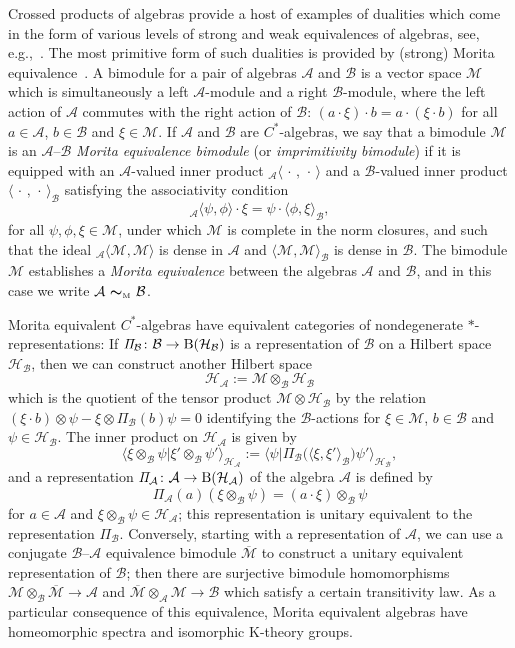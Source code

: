 \documentclass[pdftex]{sigma}
\numberwithin{equation}{section}
\newcommand{\mbf}[1]{{\boldsymbol {#1} }}
\newcommand{\Pim}{{\mathit\Pi}}
\newcommand{\rmB}{{\rm B}}
\def\alg{{\mathcal A}}
\def\balg{{\mathcal B}}
\def\hil{{\mathcal H}}
\def\Mcal{{\mathcal M}}
\begin{document}
Crossed products of algebras provide a host of examples of dualities
which come in the form of various levels of strong and weak
equivalences of algebras, see, e.g.,~\cite{Brodzki2006}. The most
primitive form of such dualities is provided by (strong) Morita
equivalence~\cite{Rieffel1974}. A bimodule for a pair of algebras $\alg$ and $\balg$ is a
vector space $\Mcal$ which is simultaneously
 a left $\alg$-module and a right $\balg$-module, where the left action
 of $\alg$ commutes with the right action of $\balg$: $(a\cdot\xi)\cdot
 b=a\cdot (\xi\cdot b)$ for all $a\in \alg$, $b\in
 \balg$ and $\xi\in \Mcal$. If $\alg$ and $\balg$ are $C^*$-algebras,
 we say that a bimodule $\Mcal$ is an $\alg$--$\balg$ \emph{Morita
 equivalence bimodule} (or \emph{imprimitivity bimodule}) if it
is equipped with an $\alg$-valued inner product
${}_\alg\langle\,\cdot\,,\,\cdot\,\rangle$ and a $\balg$-valued inner
product $\langle\,\cdot\,,\,\cdot\,\rangle_\balg$ satisfying the
associativity condition
\[
{}_\alg\langle \psi,\phi\rangle \cdot \xi =
\psi\cdot\langle\phi,\xi\rangle_\balg ,
\]
for all $\psi,\phi,\xi\in\Mcal$, under which $\Mcal$ is complete in
the norm closures, and such that the ideal ${}_\alg\langle
\Mcal,\Mcal\rangle$ is dense in $\alg$ and $\langle
\Mcal,\Mcal\rangle_\balg$ is dense in $\balg$. The bimodule $\Mcal$ establishes a
\emph{Morita equivalence} between the algebras $\alg$ and $\balg$, and
in this case we write $\alg\ \mbf\sim_{\text{\tiny M}}\ \balg$.

Morita equivalent $C^*$-algebras have equivalent categories of
nondegenerate $*$-representations: If $\Pim_\balg\colon \balg\to{\rm B}(\hil_\balg)$ is a
representation of $\balg$ on a Hilbert space $\hil_\balg$, then we can
construct another Hilbert space
\[
\hil_\alg:=\Mcal\otimes_\balg\hil_\balg
\]
which is the quotient of the tensor product $\Mcal\otimes\hil_\balg$ by the relation $(\xi\cdot
b)\otimes\psi-\xi\otimes\Pim_\balg(b)\psi=0$ identifying the
$\balg$-actions for
$\xi\in\Mcal$, $b\in\balg$ and $\psi\in\hil_\balg$. The inner product
on $\hil_\alg$ is given by
\[
\big\langle\xi\otimes_\balg\psi\big|
\xi'\otimes_\balg\psi'\big\rangle_{\hil_\alg} :=
\big\langle\psi\big|\Pim_\balg\big(\langle\xi,\xi'\rangle_\balg
\big)\psi'\big\rangle_{\hil_\balg} ,
\]
and a representation $\Pim_\alg\colon \alg\to\rmB(\hil_\alg)$ of the algebra
$\alg$ is defined by
\[
\Pim_\alg(a)(\xi\otimes_\balg\psi) = (a\cdot\xi) \otimes_\balg\psi
\]
for $a\in\alg$ and $\xi\otimes_\balg\psi\in\hil_\alg$; this
representation is unitary equivalent to the representation
$\Pim_\balg$. Conversely, starting with a representation of $\alg$, we
can use a conjugate $\balg$--$\alg$ equivalence bimodule
$\overline{\Mcal}$ to construct a unitary equivalent representation of
$\balg$; then there are surjective bimodule homomorphisms
$\Mcal\otimes_\balg\overline{\Mcal}\to\alg$ and
$\overline{\Mcal}\otimes_\alg\Mcal\to\balg$ which satisfy a certain
transitivity law. As a particular consequence of this equivalence, Morita
equivalent algebras have homeomorphic spectra and isomorphic K-theory groups.
\end{document}
